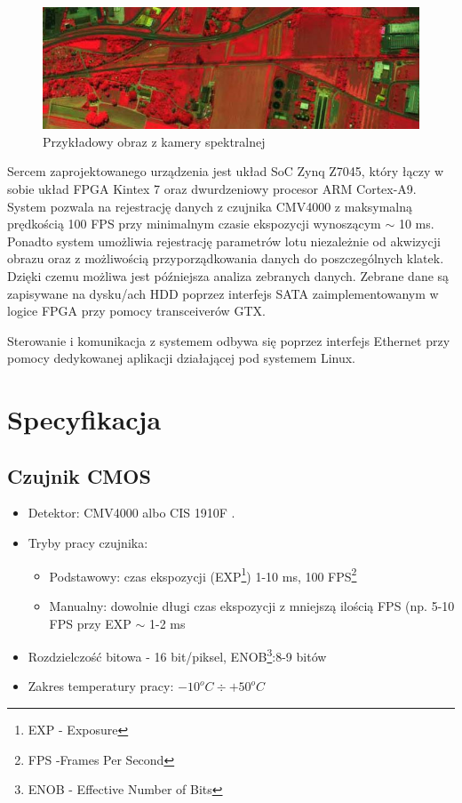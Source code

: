 \documentclass[a4paper,11pt,oneside]{report}  %
\begin{document}
\begin{figure}[htp]
	\centering
	\includegraphics[width=12cm]{spektrop_ex.jpg}
	\caption{Przykładowy obraz z kamery spektralnej\cite{SPEC_PHOTO}}
	\label{fig:EX_PHOTO}
\end{figure}


Sercem zaprojektowanego urządzenia jest układ SoC Zynq Z7045, który łączy w sobie układ FPGA Kintex 7 oraz dwurdzeniowy procesor ARM Cortex-A9. System pozwala na rejestrację danych z czujnika CMV4000 z maksymalną prędkością 100 FPS przy minimalnym czasie ekspozycji wynoszącym $\sim$ 10 ms. Ponadto system umożliwia rejestrację parametrów lotu niezależnie od akwizycji obrazu oraz z możliwością przyporządkowania danych do poszczególnych klatek. Dzięki czemu możliwa jest późniejsza analiza zebranych danych. Zebrane dane są zapisywane na dysku/ach HDD poprzez interfejs SATA zaimplementowanym w logice FPGA przy pomocy transceiverów GTX.

Sterowanie i komunikacja z systemem odbywa się poprzez interfejs Ethernet przy pomocy dedykowanej aplikacji działającej pod systemem Linux. 


\chapter{Specyfikacja}

\section{Czujnik CMOS}
\begin{itemize}
	\item Detektor: CMV4000 \cite{CMV4000} albo CIS 1910F \cite{CIS}.
	\item Tryby pracy czujnika:
		\begin{itemize}
			\item Podstawowy: czas ekspozycji (EXP\footnote{EXP - Exposure}) 1-10 ms, 100 FPS\footnote{FPS -Frames Per Second}
			\item Manualny:	dowolnie długi czas ekspozycji z mniejszą ilością FPS (np. 5-10 FPS przy EXP $\sim$ 1-2 ms
		\end{itemize}

	\item Rozdzielczość bitowa - 16 bit/piksel, ENOB\footnote{ENOB - Effective Number of Bits}:8-9 bitów
	\item Zakres temperatury pracy: $-10^{o}C \div +50^{o}C$

\end{itemize}
\end{document}
